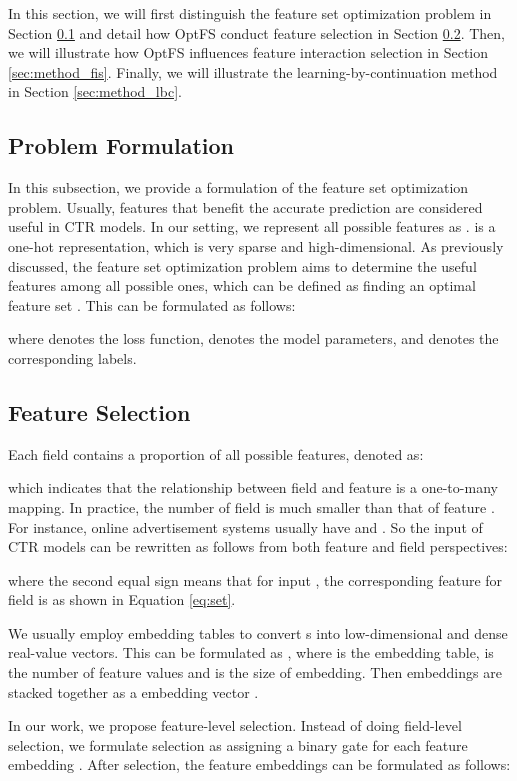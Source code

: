 \documentclass[sigconf]{acmart}
\begin{document}
In this section, we will first distinguish the feature set optimization problem in Section \ref{sec:form} and detail how OptFS conduct feature selection in Section \ref{sec:method_fs}. Then, we will illustrate how OptFS influences feature interaction selection in Section \ref{sec:method_fis}. Finally, we will illustrate the learning-by-continuation method in Section \ref{sec:method_lbc}.


\subsection{Problem Formulation}
\label{sec:form}

In this subsection, we provide a formulation of the feature set optimization problem. Usually, features that benefit the accurate prediction are considered useful in CTR models. In our setting, we represent all possible features as .  is a one-hot representation, which is very sparse and high-dimensional. As previously discussed, the feature set optimization problem aims to determine the useful features among all possible ones, which can be defined as finding an optimal feature set . This can be formulated as follows:


where  denotes the loss function,  denotes the model parameters, and  denotes the corresponding labels.

\subsection{Feature Selection}
\label{sec:method_fs}
Each field  contains a proportion of all possible features, denoted as:

which indicates that the relationship between field and feature is a one-to-many mapping. In practice, the number of field  is much smaller than that of feature . For instance, online advertisement systems usually have  and . So the input of CTR models can be rewritten as follows from both feature and field perspectives:

where the second equal sign means that for input , the corresponding feature for field  is  as shown in Equation \ref{eq:set}. 

We usually employ embedding tables to convert s into low-dimensional and dense real-value vectors. This can be formulated as , where  is the embedding table,  is the number of feature values and  is the size of embedding. Then embeddings are stacked together as a embedding vector .

In our work, we propose feature-level selection. Instead of doing field-level selection, we formulate selection as assigning a binary gate  for each feature embedding . After selection, the feature embeddings can be formulated as follows: 
\end{document}
